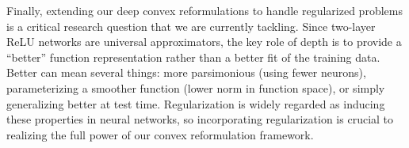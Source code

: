 Finally, extending our deep convex reformulations to handle regularized
problems is a critical research question that we are currently tackling.
Since two-layer ReLU networks are universal approximators, the key role of
depth is to provide a ``better'' function representation rather than a better
fit of the training data.
Better can mean several things: more parsimonious (using fewer neurons),
parameterizing a smoother function (lower norm in function space), or
simply generalizing better at test time.
Regularization is widely regarded as inducing these properties in neural
networks, so incorporating regularization is crucial to realizing the full
power of our convex reformulation framework.
